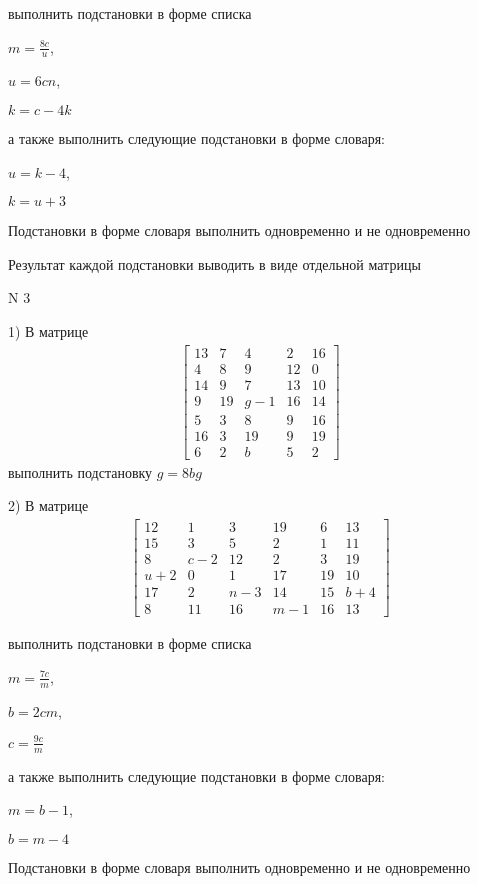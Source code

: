 \documentclass[11pt]{report}
\begin{document}
выполнить подстановки в форме списка

$m=\frac{8 c}{u}$,

$u=6 c n$,

$k=c - 4 k$

а также выполнить следующие подстановки в форме словаря:

$u=k - 4$,

$k=u + 3$


    Подстановки в форме словаря выполнить одновременно и не одновременно


    Результат каждой подстановки выводить в виде отдельной матрицы

\newpage
N 3


    1) В матрице
\begin{align*}
\left[\begin{matrix}13 & 7 & 4 & 2 & 16\\4 & 8 & 9 & 12 & 0\\14 & 9 & 7 & 13 & 10\\9 & 19 & g - 1 & 16 & 14\\5 & 3 & 8 & 9 & 16\\16 & 3 & 19 & 9 & 19\\6 & 2 & b & 5 & 2\end{matrix}\right]
\end{align*}
выполнить подстановку $g=8 b g$


    2) В матрице
\begin{align*}
\left[\begin{matrix}12 & 1 & 3 & 19 & 6 & 13\\15 & 3 & 5 & 2 & 1 & 11\\8 & c - 2 & 12 & 2 & 3 & 19\\u + 2 & 0 & 1 & 17 & 19 & 10\\17 & 2 & n - 3 & 14 & 15 & b + 4\\8 & 11 & 16 & m - 1 & 16 & 13\end{matrix}\right]
\end{align*}

выполнить подстановки в форме списка

$m=\frac{7 c}{m}$,

$b=2 c m$,

$c=\frac{9 c}{m}$

а также выполнить следующие подстановки в форме словаря:

$m=b - 1$,

$b=m - 4$


    Подстановки в форме словаря выполнить одновременно и не одновременно
\end{document}
